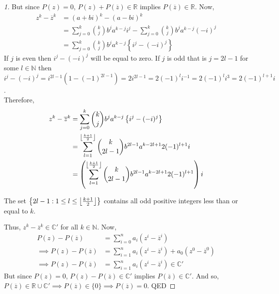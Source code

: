 \begin{proof}[1]
    But since $P(z)=0$, $P(z) + P(\overline{z}) \in \mathbb{R}$ implies $P(\overline{z})\in \mathbb{R}$. Now,
    \begin{align*}
        z^{k} - \overline{z}^{k} &= (a+bi)^{k} - (a-bi)^{k} \\
                                 &= 
                                  \sum_{j=0}^{k} {k \choose j} b^{j}a^{k-j} i^{j} -
                                  \sum_{j=0}^{k} {k \choose j} b^{j}a^{k-j} (-i)^{j} \\
                                 &=
                                 \sum_{j=0}^{k} {k \choose j} b^{j}a^{k-j}
                                 \left\{i^{j} - (-i)^{j}\right\}
    \end{align*}
    If $j$ is even then $i^{j} - (-i)^{j}$ will be equal to zero. If $j$ is odd that is $j=2l-1$ for some $l\in \mathbb{N}$ then 
    $i^{j} - (-i)^{j} = i^{2l-1} \left( 1 - (-1)^{2l-1} \right)=2i^{2l-1} = 2(-1)^{l}i^{-1} = 2(-1)^{l}i^{3} = 2(-1)^{l+1}i$. \\
    Therefore,
    \begin{align*}
        z^{k} - \overline{z}^{k} &= 
                                 \sum_{j=0}^{k} {k \choose j} b^{j}a^{k-j}
                                 \left\{i^{j} - (-i)^{j}\right\} \\
                                 &=
                                 \sum_{l=1}^{\left\lfloor \frac{k+1}{2} \right\rfloor} 
                                 {k \choose 2l-1} b^{2l-1}a^{k-2l+1} 2(-1)^{l+1}i \\
                                 &= 
                                 \left( \sum_{l=1}^{\left\lfloor \frac{k+1}{2} \right\rfloor}
                                 {k \choose 2l-1} b^{2l-1}a^{k-2l+1} 2(-1)^{l+1}\right)i
    \end{align*}
    \begin{remark}
        The set $\left\{2l-1: 1\leq l \leq \left\lfloor \frac{k+1}{2} \right\rfloor\right\}$ contains all odd positive integers less than or equal 
        to $k$.
    \end{remark}
    Thus, $z^{k} - \overline{z}^{k}\in \mathbb{C}'$ for all $k\in \mathbb{N}$. Now,
    \begin{align*}
        P(z) - P(\overline{z}) &= \sum_{i=0}^{n} a_{i} \left( z^{i} - \overline{z}^{i} \right)\\
        \implies P(z) - P(\overline{z}) &= \sum_{i=1}^{n} a_{i} \left( z^{i} - \overline{z}^{i} \right) 
                               + a_{0}\left( z^{0} - \overline{z}^{0} \right) \\
        \implies P(z) - P(\overline{z}) &= \sum_{i=1}^{n} a_{i} \left( z^{i} - \overline{z}^{i} \right) \in \mathbb{C}'
    \end{align*}
    But since $P(z)=0$, $P(z) - P(\overline{z}) \in \mathbb{C}'$ implies $P(\overline{z}) \in \mathbb{C}'$. And so, 
    $P(\overline{z})\in \mathbb{R} \cup \mathbb{C}' \implies P(\overline{z}) \in \{0\} \implies P(\overline{z}) = 0$. 
    \textsf{QED}
\end{proof}
